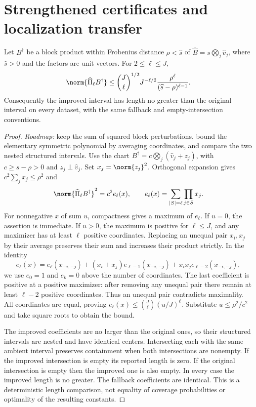\section{Strengthened certificates and localization transfer}\label{app:strengthening}
\begin{lemma}\label{lem:energy}
Let $B^\dagger$ be a block product within Frobenius distance $\rho<\widehat s$ of $\widehat B=\widehat s\bigotimes_j\widehat v_j$, where $\widehat s>0$ and the factors are unit vectors. For $2\le\ell\le J$,
\[
 \norm{\widehat\Pi_\ell B^\dagger}
 \le\binom J\ell^{1/2}J^{-\ell/2}
                \frac{\rho^\ell}{(\widehat s-\rho)^{\ell-1}}.
\]
Consequently the improved interval has length no greater than the original interval on every dataset, with the same fallback and empty-intersection conventions.
\end{lemma}
\begin{proof}
\emph{Roadmap:} keep the sum of squared block perturbations, bound the elementary symmetric polynomial by averaging coordinates, and compare the two nested structured intervals.
Use the chart $B^\dagger=c\bigotimes_j(\widehat v_j+z_j)$, with $c\ge\widehat s-\rho>0$ and $z_j\perp\widehat v_j$. Set $x_j=\norm{z_j}^2$. Orthogonal expansion gives $c^2\sum_jx_j\le\rho^2$ and
\[
 \norm{\widehat\Pi_\ell B^\dagger}^2=c^2 e_\ell(x),
 \qquad e_\ell(x)=\sum_{|S|=\ell}\prod_{j\in S}x_j.
\]
For nonnegative $x$ of sum $u$, compactness gives a maximum of $e_\ell$. If $u=0$, the assertion is immediate. If $u>0$, the maximum is positive for $\ell\le J$, and any maximizer has at least $\ell$ positive coordinates. Replacing an unequal pair $x_i,x_j$ by their average preserves their sum and increases their product strictly. In the identity
\[
 e_\ell(x)=e_\ell(x_{-i,-j})+(x_i+x_j)e_{\ell-1}(x_{-i,-j})
                         +x_ix_je_{\ell-2}(x_{-i,-j}),
\]
we use $e_0=1$ and $e_k=0$ above the number of coordinates. The last coefficient is positive at a positive maximizer: after removing any unequal pair there remain at least $\ell-2$ positive coordinates. Thus an unequal pair contradicts maximality. All coordinates are equal, proving
$e_\ell(x)\le\binom J\ell(u/J)^\ell$.
Substitute $u\le\rho^2/c^2$ and take square roots to obtain the bound.

The improved coefficients are no larger than the original ones, so their structured intervals are nested and have identical centers. Intersecting each with the same ambient interval preserves containment when both intersections are nonempty. If the improved intersection is empty its reported length is zero. If the original intersection is empty then the improved one is also empty. In every case the improved length is no greater. The fallback coefficients are identical. This is a deterministic length comparison, not equality of coverage probabilities or optimality of the resulting constants.
\end{proof}

